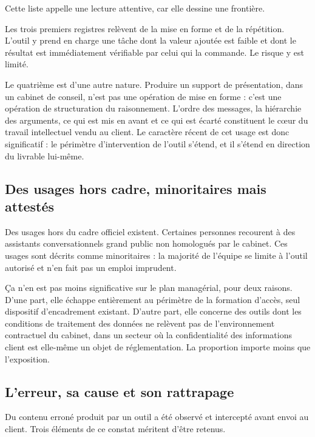Cette liste appelle une lecture attentive, car elle dessine une frontière.

Les trois premiers registres relèvent de la mise en forme et de la répétition. L'outil y
prend en charge une tâche dont la valeur ajoutée est faible et dont le résultat est
immédiatement vérifiable par celui qui la commande. Le risque y est limité.

Le quatrième est d'une autre nature. Produire un support de présentation, dans un cabinet
de conseil, n'est pas une opération de mise en forme : c'est une opération de structuration
du raisonnement. L'ordre des messages, la hiérarchie des arguments, ce qui est mis en avant
et ce qui est écarté constituent le cœur du travail intellectuel vendu au client. Le
caractère récent de cet usage est donc significatif : le périmètre d'intervention de l'outil
s'étend, et il s'étend en direction du livrable lui-même.

\subsection{Des usages hors cadre, minoritaires mais attestés}

Des usages hors du cadre officiel existent. Certaines personnes recourent à des assistants
conversationnels grand public non homologués par le cabinet. Ces usages sont décrits comme
minoritaires : la majorité de l'équipe se limite à l'outil autorisé et n'en fait pas un
emploi imprudent.


Ça n'en est pas moins significative sur le plan managérial, pour deux raisons.
D'une part, elle échappe entièrement au périmètre de la formation d'accès, seul dispositif
d'encadrement existant. D'autre part, elle concerne des outils dont les conditions de
traitement des données ne relèvent pas de l'environnement contractuel du cabinet, dans un
secteur où la confidentialité des informations client est elle-même un objet de
réglementation. La proportion importe moins que l'exposition.

\subsection{L'erreur, sa cause et son rattrapage}

Du contenu erroné produit par un outil a été observé et intercepté avant envoi au client.
Trois éléments de ce constat méritent d'être retenus.

